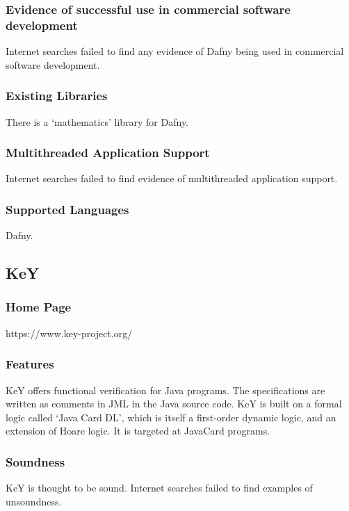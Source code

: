 \documentclass[11pt]{article}
\begin{document}
	\subsubsection{Evidence of successful use in commercial software development}
		Internet searches failed to find any evidence of Dafny being used in commercial software development. 		
	\subsubsection{Existing Libraries}
		There is a `mathematics' library for Dafny.
		
	\subsubsection{Multithreaded Application Support}
		Internet searches failed to find evidence of multithreaded application support. 
		
	\subsubsection{Supported Languages}
		Dafny.















\subsection{KeY}
	\subsubsection{Home Page}%
	https://www.key-project.org/
	\subsubsection{Features} 
		KeY offers functional verification for Java programs. The specifications are written as comments in JML in the Java source code. KeY is built on a formal logic called `Java Card DL', which is itself a first-order dynamic logic, and an extension of Hoare logic. It is targeted at JavaCard programs. 
	\subsubsection{Soundness} 
		KeY is thought to be sound. Internet searches failed to find examples of unsoundness.
\end{document}
